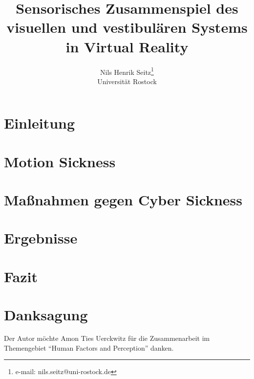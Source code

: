 \documentclass[preprint]{vgtc}               %
\title{Sensorisches Zusammenspiel des visuellen und vestibul\"aren Systems in Virtual Reality}
\author{Nils Henrik Seitz\thanks{e-mail: nils.seitz@uni-rostock.de}\\ \scriptsize Universit\"at Rostock}
\begin{document}
\maketitle
\section{Einleitung} 
	
\section{Motion Sickness}
	
	
\newpage
\section{Maßnahmen gegen Cyber Sickness}\label{Maßnahmen gegen CS}
	

\section{Ergebnisse}
	

\section{Fazit}
	

\section*{Danksagung}{
	Der Autor m\"ochte Amon Ties Uerckwitz f\"ur die Zusammenarbeit im Themengebiet "`Human Factors and Perception"' danken.}



\end{document}
